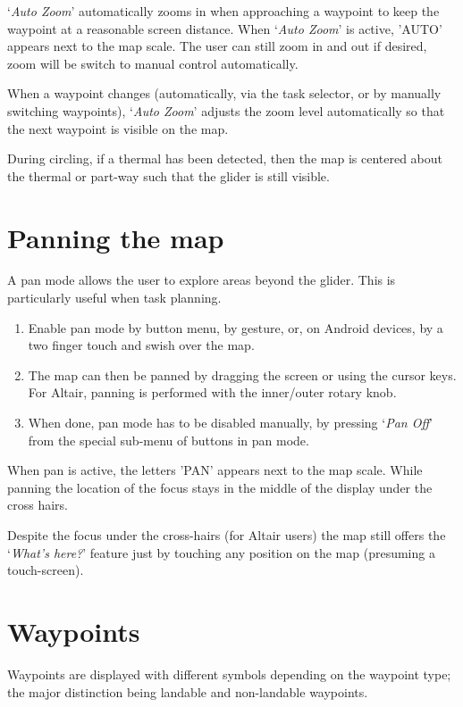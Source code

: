 `{\it Auto Zoom}' automatically zooms in when approaching a waypoint to keep
the waypoint at a reasonable screen distance. When `{\it Auto Zoom}' is active,
'AUTO' appears next to the map scale. The user can still zoom
in and out if desired, zoom will be switch to manual control automatically.

When a waypoint changes (automatically, via the task selector, or by
manually switching waypoints), `{\it Auto Zoom}' adjusts the zoom level
automatically so that the next waypoint is visible on the map.

During circling, if a thermal has been detected, then the map is centered about
the thermal or part-way such that the glider is still visible.

\section{Panning the map}\label{sec:panning}

A pan mode allows the user to explore areas beyond the glider.  This
is particularly useful when task planning.
\begin{enumerate}
\item Enable pan mode by button menu, by gesture, or, on Android devices,
  by a two finger touch and swish over the map.
\item The map can then be panned by dragging the screen or using the cursor
  keys.  For Altair, panning is performed with the inner/outer rotary knob.
\item When done, pan mode has to be disabled manually, by pressing `{\it Pan Off}'
  from the special sub-menu of buttons in pan mode.
\end{enumerate}

When pan is active, the letters 'PAN' appears next to the map scale.  While
panning the location of the focus stays in the middle of the display under the
cross hairs.

Despite the focus under the cross-hairs (for Altair users) the map
still offers the `{\it What's here?}' feature just by touching any
position on the map (presuming a touch-screen).


\section{Waypoints} \label{sec:waypoint-schemes}
Waypoints are displayed with different symbols depending on the
waypoint type; the major distinction being landable and non-landable
waypoints.

